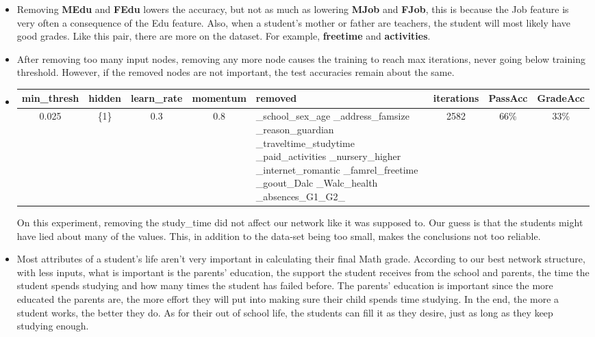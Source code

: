 \documentclass[11pt]{article}
\begin{document}
\begin{itemize}
\item Removing \textbf{MEdu} and \textbf{FEdu} lowers the accuracy, but not as much as lowering \textbf{MJob} and \textbf{FJob}, this is because the Job feature is very often a consequence of the Edu feature. Also, when a student's mother or father are teachers, the student will most likely have good grades. Like this pair, there are more on the dataset. For example, \textbf{freetime} and \textbf{activities}.
\item After removing too many input nodes, removing any more node causes the training to reach max iterations, never going below training threshold. However, if the removed nodes are not important, the test accuracies remain about the same.
\item \begin{tabular}{| c | c | c | c | p{3cm} | c | c | c |}
\hline \textbf{min\_thresh} & \textbf{hidden} & \textbf{learn\_rate} & \textbf{momentum} & \textbf{removed} & \textbf{iterations} & \textbf{PassAcc} & \textbf{GradeAcc}\\
\hline 0.025 & \{1\} & 0.3 & 0.8 & \_school\_sex\_age \_address\_famsize \_reason\_guardian \_traveltime\_studytime \_paid\_activities \_nursery\_higher \_internet\_romantic \_famrel\_freetime \_goout\_Dalc \_Walc\_health \_absences\_G1\_G2\_ & 2582 & 66\% & 33\%\\
\hline
\end{tabular}
On this experiment, removing the study\_time did not affect our network like it was supposed to. Our guess is that the students might have lied about many of the values. This, in addition to the data-set being too small, makes the conclusions not too reliable.
\item Most attributes of a student's life aren't very important in calculating their final Math grade. According to our best network structure, with less inputs, what is important is the parents' education, the support the student receives from the school and parents, the time the student spends studying and how many times the student has failed before. The parents' education is important since the more educated the parents are, the more effort they will put into making sure their child spends time studying. In the end, the more a student works, the better they do. As for their out of school life, the students can fill it as they desire, just as long as they keep studying enough.
\end{itemize}


\newpage
\end{document}
